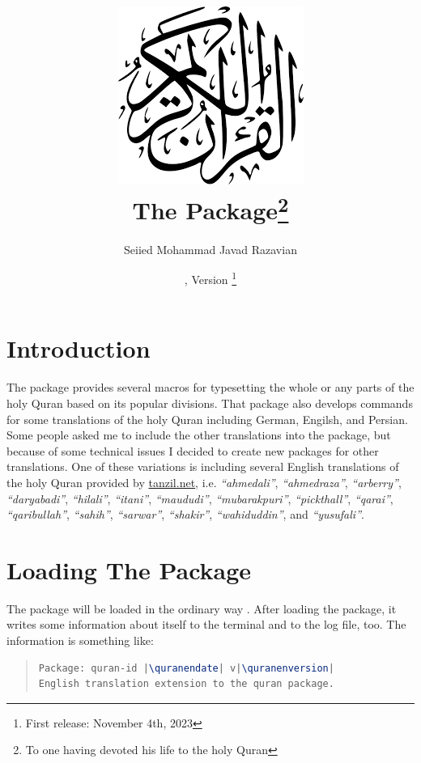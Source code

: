 \documentclass[a4paper]{ltxdoc}
\title{\includegraphics[scale=.3]{quran.png}\\
The \xpackage{quran-en} Package\footnote{To one having devoted his life to the holy Quran}\\
}
\author{Seiied Mohammad Javad Razavian\\\xemail{javadr@gmail.com}}
\date{\quranendate,  Version \quranenversion\footnote{First release: November 4th, 2023}}
\begin{document}
\maketitle

\tableofcontents

\section{Introduction}
The  package provides several macros for
typesetting the whole or any parts of the holy Quran based on its popular divisions. That package also develops
commands for some translations of the holy Quran including German, Engilsh, and Persian.
Some people asked me to include the other translations into the  package,
but because of some technical issues I decided to create new packages for other translations.
One of these variations is  including several English translations of the holy Quran
provided by \url{tanzil.net}, i.e. \emph{``ahmedali''}, \emph{``ahmedraza''}, \emph{``arberry''}, \emph{``daryabadi''}, \emph{``hilali''}, \emph{``itani''}, \emph{``maududi''}, \emph{``mubarakpuri''}, \emph{``pickthall''}, \emph{``qarai''}, \emph{``qaribullah''}, \emph{``sahih''}, \emph{``sarwar''}, \emph{``shakir''}, \emph{``wahiduddin''}, and \emph{``yusufali''}.


\section{Loading The Package}
The package will be loaded in the ordinary way
.
After loading the package, it writes some information about itself to the
terminal and to the log file, too. The information is something like:

\begin{quote}
\begin{lstlisting}[style=BashInputStyle, language=tex, escapechar={|}]
Package: quran-id |\quranendate| v|\quranenversion|
English translation extension to the quran package.
\end{lstlisting}
\end{quote}
\end{document}
